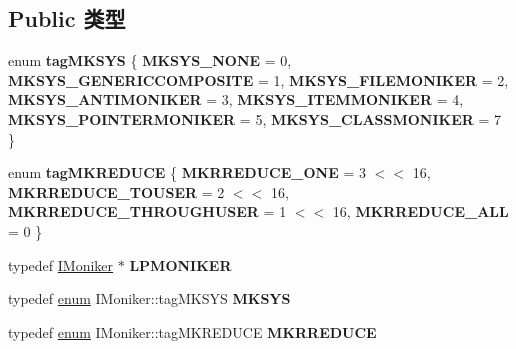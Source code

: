 \subsection*{Public 类型}
\begin{DoxyCompactItemize}
\item 
\mbox{\label{interface_i_moniker_ad653a1be0d42c7c5c8ed9f5d63f648ce}} 
enum {\bfseries tag\+M\+K\+S\+YS} \{ \newline
{\bfseries M\+K\+S\+Y\+S\+\_\+\+N\+O\+NE} = 0, 
{\bfseries M\+K\+S\+Y\+S\+\_\+\+G\+E\+N\+E\+R\+I\+C\+C\+O\+M\+P\+O\+S\+I\+TE} = 1, 
{\bfseries M\+K\+S\+Y\+S\+\_\+\+F\+I\+L\+E\+M\+O\+N\+I\+K\+ER} = 2, 
{\bfseries M\+K\+S\+Y\+S\+\_\+\+A\+N\+T\+I\+M\+O\+N\+I\+K\+ER} = 3, 
\newline
{\bfseries M\+K\+S\+Y\+S\+\_\+\+I\+T\+E\+M\+M\+O\+N\+I\+K\+ER} = 4, 
{\bfseries M\+K\+S\+Y\+S\+\_\+\+P\+O\+I\+N\+T\+E\+R\+M\+O\+N\+I\+K\+ER} = 5, 
{\bfseries M\+K\+S\+Y\+S\+\_\+\+C\+L\+A\+S\+S\+M\+O\+N\+I\+K\+ER} = 7
 \}
\item 
\mbox{\label{interface_i_moniker_a48f8016d2349c1ac4c4cc35c55707ec6}} 
enum {\bfseries tag\+M\+K\+R\+E\+D\+U\+CE} \{ {\bfseries M\+K\+R\+R\+E\+D\+U\+C\+E\+\_\+\+O\+NE} = 3 $<$$<$ 16, 
{\bfseries M\+K\+R\+R\+E\+D\+U\+C\+E\+\_\+\+T\+O\+U\+S\+ER} = 2 $<$$<$ 16, 
{\bfseries M\+K\+R\+R\+E\+D\+U\+C\+E\+\_\+\+T\+H\+R\+O\+U\+G\+H\+U\+S\+ER} = 1 $<$$<$ 16, 
{\bfseries M\+K\+R\+R\+E\+D\+U\+C\+E\+\_\+\+A\+LL} = 0
 \}
\item 
\mbox{\label{interface_i_moniker_a4edaf7cd64938c8c87018bee36a36c2f}} 
typedef \hyperlink{interface_i_moniker}{I\+Moniker} $\ast$ {\bfseries L\+P\+M\+O\+N\+I\+K\+ER}
\item 
\mbox{\label{interface_i_moniker_aea58843bcb6d2841fde7a28fa58083c5}} 
typedef \hyperlink{interfaceenum}{enum} I\+Moniker\+::tag\+M\+K\+S\+YS {\bfseries M\+K\+S\+YS}
\item 
\mbox{\label{interface_i_moniker_ae04037ba9b588180b242b004d42ed855}} 
typedef \hyperlink{interfaceenum}{enum} I\+Moniker\+::tag\+M\+K\+R\+E\+D\+U\+CE {\bfseries M\+K\+R\+R\+E\+D\+U\+CE}
\end{DoxyCompactItemize}
